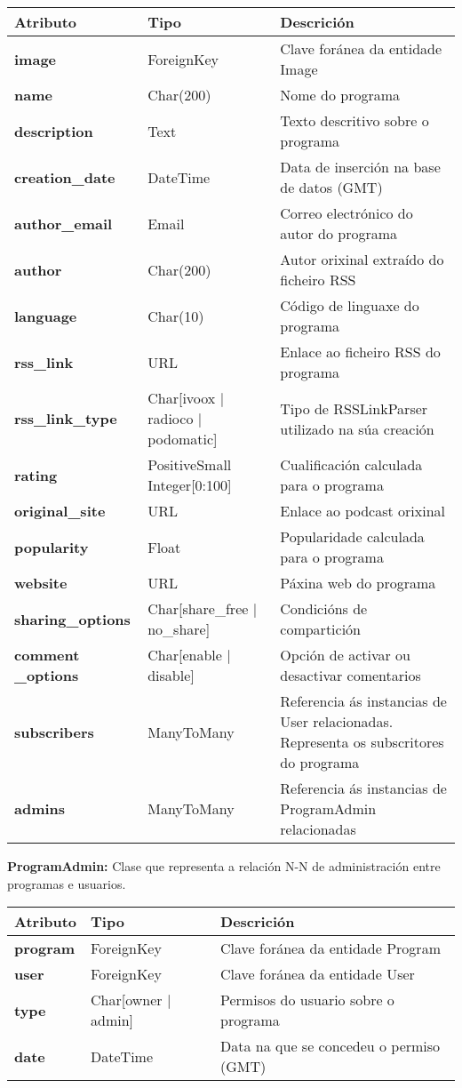 \begin{tabular}{|p{3cm}|p{3cm}|p{8cm}|}
	\hline
	Atributo & Tipo & Descrición\\
	\hline
	\textbf{image} & ForeignKey & Clave foránea da entidade Image\\
	\hline
	\textbf{name} & Char(200) & Nome do programa\\	
	\hline
	\textbf{description} & Text & Texto descritivo sobre o programa\\
	\hline
	\textbf{creation\_date} & DateTime & Data de inserción na base de datos (GMT)\\
	\hline
	\textbf{author\_email} & Email & Correo electrónico do autor do programa\\
	\hline
	\textbf{author} & Char(200) & Autor orixinal extraído do ficheiro RSS\\
	\hline
	\textbf{language} & Char(10) & Código de linguaxe do programa\\
	\hline
	\textbf{rss\_link} & URL & Enlace ao ficheiro RSS do programa\\
	\hline
	\textbf{rss\_link\_type} & Char[ivoox $|$ radioco $|$ podomatic] & Tipo de RSSLinkParser utilizado na súa creación\\
	\hline
	\textbf{rating} & PositiveSmall Integer[0:100] & Cualificación calculada para o programa\\
	\hline
	\textbf{original\_site} & URL & Enlace ao podcast orixinal\\
	\hline
	\textbf{popularity } & Float & Popularidade calculada para o programa\\
	\hline
	\textbf{website} & URL & Páxina web do programa\\
	\hline
	\textbf{sharing\_options} & Char[share\_free $|$ no\_share] & Condicións de compartición\\
	\hline
	\textbf{comment \_options} & Char[enable $|$ disable] & Opción de activar ou desactivar comentarios\\
	\hline
	\textbf{subscribers} &  ManyToMany & Referencia ás instancias de User relacionadas. Representa os subscritores do programa\\
	\hline
	\textbf{admins} &  ManyToMany & Referencia ás instancias de ProgramAdmin relacionadas\\
	\hline
\end{tabular}


\textbf{ProgramAdmin:} Clase que representa a relación N-N de administración entre programas e usuarios.

\begin{tabular}{|p{3cm}|p{3cm}|p{8cm}|}
	\hline
	Atributo & Tipo & Descrición\\
	\hline
	\textbf{program} & ForeignKey & Clave foránea da entidade Program\\
	\hline
	\textbf{user} & ForeignKey & Clave foránea da entidade User\\	
	\hline
	\textbf{type} & Char[owner $|$ admin] & Permisos do usuario sobre o programa\\
	\hline
	\textbf{date} & DateTime & Data na que se concedeu o permiso (GMT)\\
	\hline
\end{tabular}



